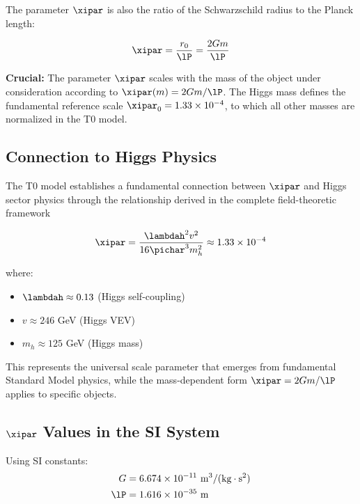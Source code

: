 	The parameter $\xipar$ is also the ratio of the Schwarzschild radius to the Planck length:
	
	\begin{equation}
		\xipar = \frac{r_0}{\lP} = \frac{2Gm}{\lP}
		\label{eq:xi_definition}
	\end{equation}
	
\textbf{Crucial:} The parameter $\xipar$ scales with the mass of the object under consideration according to $\xipar(m) = 2Gm/\lP$. The Higgs mass defines the fundamental reference scale $\xipar_0 = 1.33 \times 10^{-4}$, to which all other masses are normalized in the T0 model.
	
	\subsection{Connection to Higgs Physics}
	\label{subsec:xi_higgs_connection}
	
	The T0 model establishes a fundamental connection between $\xipar$ and Higgs sector physics through the relationship derived in the complete field-theoretic framework 
	
	\begin{equation}
		\xipar = \frac{\lambdah^2 v^2}{16\pichar^3 m_h^2} \approx 1.33 \times 10^{-4}
		\label{eq:xi_higgs_fundamental}
	\end{equation}
	
	where:
	\begin{itemize}
		\item $\lambdah \approx 0.13$ (Higgs self-coupling)
		\item $v \approx 246$ GeV (Higgs VEV)
		\item $m_h \approx 125$ GeV (Higgs mass)
	\end{itemize}
	
	This represents the universal scale parameter that emerges from fundamental Standard Model physics, while the mass-dependent form $\xipar = 2Gm/\lP$ applies to specific objects.
	
	\subsection{$\xipar$ Values in the SI System}
	\label{subsec:xi_si_values}
	
	Using SI constants:
	\begin{align}
		G &= 6.674 \times 10^{-11} \text{ m}^3/(\text{kg} \cdot \text{s}^2) \\
		\lP &= 1.616 \times 10^{-35} \text{ m}
	\end{align}
	
